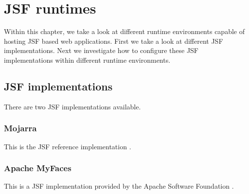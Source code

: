 %

\chapter{JSF runtimes}
Within this chapter, we take a look at different runtime environments capable of hosting JSF based web applications.
First we take a look at different JSF implementations.
Next we investigate how to configure these JSF implementations within different runtime environments.

\section{JSF implementations}
There are two JSF implementations available.
\subsection{Mojarra}
This is the JSF reference implementation \cite{mojarra}.
\subsection{Apache MyFaces}
This is a JSF implementation provided by the Apache Software Foundation \cite{myfaces}.

